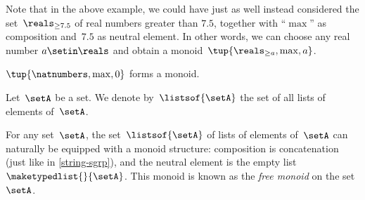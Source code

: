 \begin{remark}
    Note that in the above example, we could have just as well instead considered the set~$\reals_{\geq 7.5}$ of real numbers greater than $7.5$, together with ``$\max$'' as composition and~$7.5$ as neutral element.
    In other words, we can choose any real number $a \setin \reals$ and obtain a monoid~$\tup{\reals_{\geq a},\max, a}$.
\end{remark}

\begin{example}
    $\tup{\natnumbers, \max,0}$ forms a monoid.
\end{example}

\begin{definition}
    \label{def:set-of-lists}
    Let~$\setA$ be a set.
    We denote by~$\listsof{\setA}$ the set of all lists of elements of~$\setA$.
\end{definition}

\begin{example}
    \label{exa:string-monoid}
    For any set~$\setA$, the set~$\listsof{\setA}$ of lists of elements of~$\setA$ can naturally be equipped with a monoid structure: composition is concatenation (just like in \cref{string-sgrp}), and the neutral element is the empty list~$\maketypedlist{}{\setA}$.
    This monoid is known as the \emph{free monoid} on the set~$\setA$.
\end{example}

